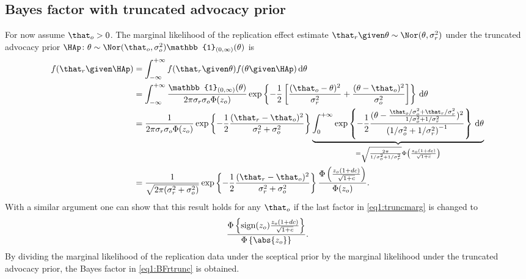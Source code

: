 \begin{subappendices}
\section{Bayes factor with truncated advocacy prior}
\label{app:BFtrunc}
For now assume $\that_o > 0$. The marginal likelihood of the replication effect
estimate $\that_r \given \theta \sim \Nor(\theta, \sigma^2_r)$ under the
truncated advocacy prior
$\HAp \colon \theta \sim \Nor(\that_o, \sigma^2_o) \mathbb{1}_{(0, \infty)}(\theta)$
is
\begin{align}
  f(\that_r \given \HAp)
  &= \int_{-\infty}^{+\infty} f(\that_r \given \theta) f(\theta \given
  \HAp) \, \text{d}\theta \nonumber \\
  &= \int_{-\infty}^{+\infty}
  \frac{\mathbb{1}_{(0, \infty)}(\theta)}{2\pi\sigma_r\sigma_o\Phi(z_o)}
  \exp\left\{-\frac{1}{2}\left[\frac{(\that_o - \theta)^2}{\sigma^2_r}
  + \frac{(\theta - \that_o)^2}{\sigma^2_o}\right]\right\}
  \, \text{d}\theta \nonumber \\
  &=
  \frac{1}{2\pi\sigma_r\sigma_o\Phi(z_o)}
  \exp\left\{-\frac{1}{2}\frac{(\that_r - \that_o)^2}{\sigma^2_r + \sigma^2_o}\right\}
   \underbrace{\int_{0}^{+\infty}
   \exp\left\{-\frac{1}{2}\frac{(\theta - \frac{\that_o/\sigma^2_o +
       \that_r/\sigma^2_r}{1/\sigma^2_o + 1/\sigma^2_r})^2}{\left(
     1/\sigma^2_o + 1/\sigma^2_r\right)^{-1}}\right\}
   \, \text{d}\theta}_{=\sqrt{\frac{2\pi}{1/\sigma^2_o + 1/\sigma^2_r}}
  \Phi\left(\frac{z_o(1 + dc)}{\sqrt{1 + c}}\right)} \nonumber \\
   &= \frac{1}{\sqrt{2\pi(\sigma_r^2 + \sigma_o^2)}}
   \exp\left\{-\frac{1}{2}\frac{(\that_r - \that_o)^2}{\sigma^2_r + \sigma^2_o}
     \right\}  \frac{\Phi\left(\frac{z_o(1 + dc)}{\sqrt{1 + c}}\right)}{
     \Phi(z_o)}.
   \label{eq1:truncmarg}
\end{align}
With a similar argument one can show that this result holds for any $\that_o$ if
the last factor in \eqref{eq1:truncmarg} is changed to
\begin{align*}
  \frac{\Phi\left\{\text{sign}(z_o) \frac{z_o(1 + dc)}{\sqrt{1 + c}}
  \right\}}{\Phi\left\{\abs{z_o}\right\}}.
\end{align*}
By dividing the marginal likelihood of the replication data under the
sceptical prior by the marginal likelihood under the truncated advocacy prior,
the Bayes factor in \eqref{eq1:BFrtrunc} is obtained.



\end{subappendices}
